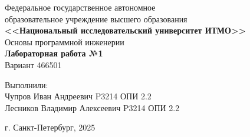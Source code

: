 
\begin{titlepage}
    \centering
    Федеральное государственное автономное \\
    образовательное учреждение высшего образования \\
    \textbf{<<Национальный исследовательский университет ИТМО>>} \\

    \vfill
    Основы программной инженерии \\
    \vspace{0.5\baselineskip}
    \textbf{Лабораторная работа №1} \\
    \vspace{0.5\baselineskip}
    Вариант 466501 \\

    \vfill

    \flushright
    Выполнили:\\ 
    Чупров Иван Андреевич P3214 ОПИ 2.2\\
    Лесников Владимир Алексеевич P3214 ОПИ 2.2\\
    

    \vspace{4\baselineskip}
    
    \centering
    г. Санкт-Петербург, 2025

\end{titlepage}